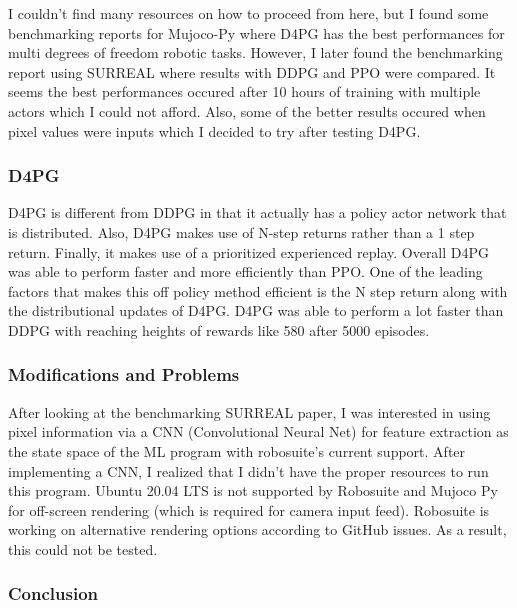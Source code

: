 \documentclass[8pt]{extarticle}
\begin{document}
\begin{adjmulticols}{2}{-1in}{-1in}
I couldn't find many resources on how to proceed from here, but I found some benchmarking reports for Mujoco-Py where D4PG has the best performances for multi degrees of freedom robotic tasks. However, I later found the benchmarking report using SURREAL where results with DDPG and PPO were compared. It seems the best performances occured after 10 hours of training with multiple actors which I could not afford. Also, some of the better results occured when pixel values were inputs which I decided to try after testing D4PG.

\subsubsection{D4PG}

D4PG is different from DDPG in that it actually has a policy actor network that is distributed. Also, D4PG makes use of N-step returns rather than a 1 step return. Finally, it makes use of a prioritized experienced replay. Overall D4PG was able to perform faster and more efficiently than PPO. One of the leading factors that makes this off policy method efficient is the N step return along with the distributional updates of D4PG. D4PG was able to perform a lot faster than DDPG with reaching heights of rewards like 580 after 5000 episodes.

\subsubsection{Modifications and Problems}

After looking at the benchmarking SURREAL paper, I was interested in using pixel information via a CNN (Convolutional Neural Net) for feature extraction as the state space of the ML program with robosuite's current support. After implementing a CNN, I realized that I didn't have the proper resources to run this program. Ubuntu 20.04 LTS is not supported by Robosuite and Mujoco Py for off-screen rendering (which is required for camera input feed). Robosuite is working on alternative rendering options according to GitHub issues. As a result, this could not be tested. 


\subsubsection{Conclusion}


\end{adjmulticols}
\end{document}
